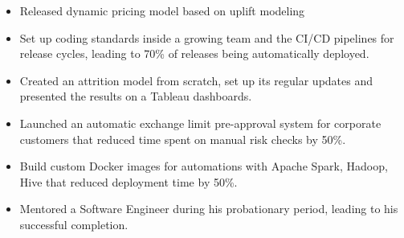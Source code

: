 \begin{itemize}
    \item Released dynamic pricing model based on uplift modeling
    \item Set up coding standards inside a growing team and the CI/CD pipelines for release cycles, leading to 70\% of releases being automatically deployed.
    \item Created an attrition model from scratch, set up its regular updates and presented the results on a Tableau dashboards.
    \item Launched an automatic exchange limit pre-approval system for corporate customers that reduced time spent on manual risk checks by 50\%.
    \item Build custom Docker images for automations with Apache Spark, Hadoop, Hive that reduced deployment time by 50\%.
    \item Mentored a Software Engineer during his probationary period, leading to his successful completion.
\end{itemize}
